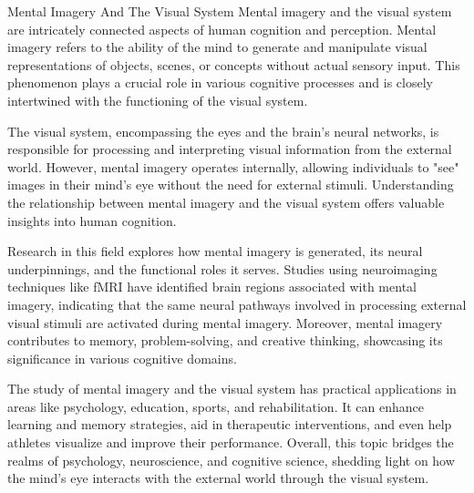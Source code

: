 \begin{notes}{Mental Imagery And The Visual System}
    Mental imagery and the visual system are intricately connected aspects of human cognition and perception. Mental imagery refers to the ability of the mind to generate and manipulate visual 
    representations of objects, scenes, or concepts without actual sensory input. This phenomenon plays a crucial role in various cognitive processes and is closely intertwined with the functioning 
    of the visual system.

    The visual system, encompassing the eyes and the brain's neural networks, is responsible for processing and interpreting visual information from the external world. However, mental imagery 
    operates internally, allowing individuals to "see" images in their mind's eye without the need for external stimuli. Understanding the relationship between mental imagery and the visual system 
    offers valuable insights into human cognition.

    Research in this field explores how mental imagery is generated, its neural underpinnings, and the functional roles it serves. Studies using neuroimaging techniques like fMRI have identified 
    brain regions associated with mental imagery, indicating that the same neural pathways involved in processing external visual stimuli are activated during mental imagery. Moreover, mental 
    imagery contributes to memory, problem-solving, and creative thinking, showcasing its significance in various cognitive domains.

    The study of mental imagery and the visual system has practical applications in areas like psychology, education, sports, and rehabilitation. It can enhance learning and memory strategies, 
    aid in therapeutic interventions, and even help athletes visualize and improve their performance. Overall, this topic bridges the realms of psychology, neuroscience, and cognitive science, 
    shedding light on how the mind's eye interacts with the external world through the visual system.
\end{notes}